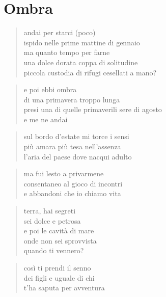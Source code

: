 \chapter*{Ombra}


\begin{verse}
    andai per starci (poco)\\
    ispido nelle prime mattine di gennaio\\
    ma quanto tempo per farne\\
    una dolce dorata coppa di solitudine\\
    piccola custodia di rifugi cesellati a mano?
\end{verse}

\begin{verse}
    e poi ebbi ombra\\
    di una primavera troppo lunga\\
    presi una di quelle primaverili sere di agosto\\
    e me ne andai
\end{verse}

\clearpage


\begin{verse}
    sul bordo d'estate mi torce i sensi\\
    più amara più tesa nell'assenza\\
    l'aria del paese dove nacqui adulto
\end{verse}

\begin{verse}
    ma fui lesto a privarmene\\
    consentaneo al gioco di incontri\\
    e abbandoni che io chiamo vita
\end{verse}

\clearpage


\begin{verse}
    terra, hai segreti\\
    sei dolce e petrosa\\
    e poi le cavità di mare\\
    onde non sei sprovvista\\
    quando ti vennero?
\end{verse}

\begin{verse}
    così ti prendi il senno\\
    dei figli e uguale di chi\\
    t'ha saputa per avventura
\end{verse}

